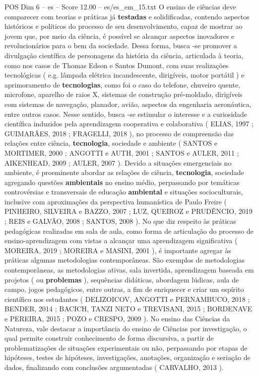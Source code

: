 \begin{textsample}{POS Dim 6 – es – Score 12.00 – es/es\_em\_15.txt}
O ensino de ciências deve comparecer com teorias e práticas já \textbf{testadas} e solidificadas, contendo aspectos históricos e políticos do processo de seu desenvolvimento, capaz de mostrar ao jovem que, por meio da ciência, é possível se alcançar aspectos inovadores e revolucionários para o bem da sociedade.
Dessa forma, busca -se promover a divulgação científica de personagens da história da ciência, articulada à teoria, como nos casos de Thomas Edson e Santos Dumont, com suas realizações tecnológicas ( e.g. lâmpada elétrica incandescente, dirigíveis, motor portátil ) e aprimoramento de \textbf{tecnologias}, como foi o caso do telefone, chuveiro quente, microfone, aparelho de raios X, sistemas de construção pré-moldado, dirigíveis com sistemas de navegação, planador, avião, aspectos da engenharia aeronáutica, entre outros casos.
Nesse sentido, busca -se estimular o interesse e a curiosidade científica induzidos pela aprendizagem cooperativa e colaborativa ( ELIAS, 1997 ; GUIMARÃES, 2018 ; FRAGELLI, 2018 ), no processo de compreensão das relações entre ciência, \textbf{tecnologia}, sociedade e ambiente ( SANTOS e MORTIMER, 2000 ; ANGOTTI e AUTH, 2001 ; SANTOS e AULER, 2011 ; AIKENHEAD, 2009 ; AULER, 2007 ).
Devido a situações emergenciais no ambiente, é proeminente abordar as relações de ciência, \textbf{tecnologia}, sociedade agregando questões \textbf{ambientais} no ensino médio, perpassando por temáticas controvérsias e transversais de educação \textbf{ambiental} e situações socioculturais, inclusive com aproximações da perspectiva humanística de Paulo Freire ( PINHEIRO, SILVEIRA e BAZZO, 2007 ; LUZ, QUEIROZ e PRUDÊNCIO, 2019 ; REIS e GALVÃO, 2008 ; SANTOS, 2008 ).
No que diz respeito às práticas pedagógicas realizadas em sala de aula, como forma de articulação do processo de ensino-aprendizagem com vistas a alcançar uma aprendizagem significativa ( MOREIRA, 2019 ; MOREIRA e MASINI, 2001 ), é importante agregar às práticas algumas metodologias contemporâneas.
São exemplos de metodologias contemporâneas, as metodologias ativas, sala invertida, aprendizagem baseada em projetos ( ou \textbf{problemas} ), sequências didáticas, abordagem lúdicas, aula de campo, jogos pedagógicos, entre outras, a fim de enriquecer e criar um espírito científico nos estudantes ( DELIZOICOV, ANGOTTI e PERNAMBUCO, 2018 ; BENDER, 2014 ; BACICH, TANZI NETO e TREVISANI, 2015 ; BORDENAVE e PEREIRA, 2015 ; POZO e CRESPO, 2009 ).
No ensino das Ciências da Natureza, vale destacar a importância do ensino de Ciências por investigação, o qual permite construir conhecimento de forma discursiva, a partir de problematizações de situações experimentais ou não, perpassando por etapas de hipóteses, testes de hipóteses, investigações, anotações, organização e seriação de dados, finalizando com conclusões argumentadas ( CARVALHO, 2013 ).

\end{textsample}

